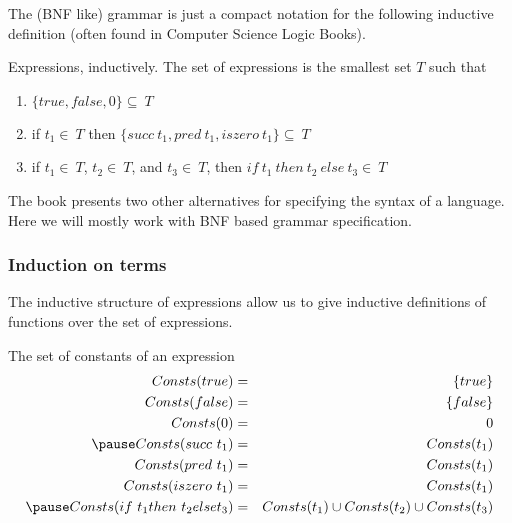\documentclass{beamer}
\begin{document}
\begin{frame}
The (BNF like) grammar is just a compact notation 
for the following inductive definition (often found 
in Computer Science Logic Books). 

\begin{definition}{{\color{blue}Expressions, inductively.}}
The set of expressions is the smallest set $T$
such that

\begin{enumerate}
  \item $\{true, false, 0\}\subseteq\ T$
  \item if $t_1 \in\ T$ then $\{succ\ t_1, pred\ t_1, iszero\ t_1\} \subseteq\ T$
  \item if $t_1 \in\ T$, $t_2 \in\ T$, and  $t_3 \in\ T$, then $if\ t_1\ then\ t_2\ else\ t_3 \in\ T$
\end{enumerate}
\end{definition} 

\pause The book presents two other alternatives for specifying the 
syntax of a language. \pause Here we will mostly work with BNF 
based grammar specification. 

\end{frame}

\begin{frame}
\frametitle{Induction on terms} 

The inductive structure of expressions allow us 
to give inductive definitions of functions over 
the set of expressions. 

\begin{definition}{{\color{blue}The set of constants of an expression}}
\begin{eqnarray*}
Consts(true)         & = & \{true\}         \\
Consts(false)        & = & \{false\}        \\
Consts(0)            & = & {0}            \\ \pause 
Consts(succ\ t_1)    & = & Consts(t_1)    \\ 
Consts(pred\ t_1)    & = & Consts(t_1)    \\ 
Consts(iszero\ t_1)  & = & Consts(t_1)    \\ \pause 
Consts(if\ t_1 then\ t_2 else t_3) & = & Consts(t_1) \cup Consts(t_2) \cup Consts(t_3) \\  
\end{eqnarray*}

\end{definition} 
\end{frame}
\end{document}
